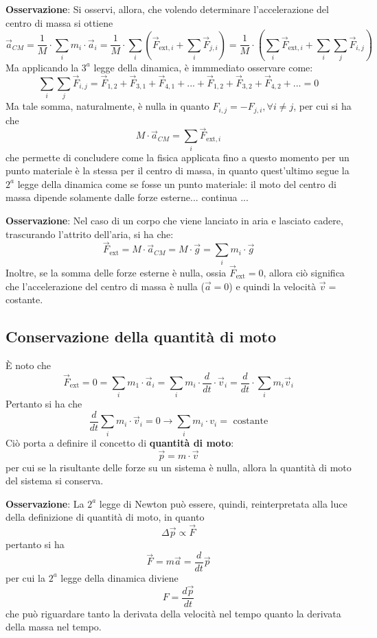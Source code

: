 \documentclass[a4paper]{extarticle}
\begin{document}
\vspace{1em}
\noindent
\textbf{Osservazione}: Si osservi, allora, che volendo determinare l'accelerazione del centro di massa si ottiene
\[\vec a_{CM} = \frac{1}{M} \cdot \sum_i m_i \cdot \vec a_i = \frac{1}{M} \cdot \sum_i \left( \vec F_{\text{ext},i} + \sum_i \vec F_{j,i} \right) = \frac{1}{M} \cdot \left(\sum_i \vec F_{\text{ext},i} + \sum_i \sum_j \vec F_{i,j}\right)\]
Ma applicando la $3^a$ legge della dinamica, è immmediato osservare come:
\[\sum_i \sum_j \vec F_{i,j} = \vec F_{1,2} + \vec F_{3,1} + \vec F_{4,1} + ... + \vec F_{1,2} + \vec F_{3,2} + \vec F_{4,2} + ... = 0\]
Ma tale somma, naturalmente, è nulla in quanto $F_{i,j}=-F_{j,i}, \forall i \neq j$, per cui si ha che
\[\boxed{M \cdot \vec a_{CM} = \sum_i \vec F_{\text{ext},i}}\]
che permette di concludere come la fisica applicata fino a questo momento per un punto materiale è la stessa per il centro di massa, in quanto quest'ultimo segue la $2^a$ legge della dinamica come se fosse un punto materiale: il moto del centro di massa dipende solamente dalle forze esterne... continua ...

\vspace{1em}
\noindent
\textbf{Osservazione}: Nel caso di un corpo che viene lanciato in aria e lasciato cadere, trascurando l'attrito dell'aria, si ha che:
\[\vec F_{\text{ext}} = M \cdot \vec a_{CM} = M \cdot \vec g = \sum_{i} m_i \cdot \vec g\]
Inoltre, se la somma delle forze esterne è nulla, ossia $\vec F_{\text{ext}}=0$, allora ciò significa che l'accelerazione del centro di massa è nulla ($\vec a = 0$) e quindi la velocità $\vec v = $ costante.

\vspace{1em}
\subsection{Conservazione della quantità di moto}
È noto che
\[\vec F_{\text{ext}} = 0 = \sum_i m_1 \cdot \vec a_i = \sum_i m_i \cdot \frac{d}{dt} \cdot \vec v_i = \frac{d}{dt} \cdot \sum_i m_i \vec v_i\]
Pertanto si ha che
\[\frac{d}{dt} \sum_i m_i \cdot \vec v_i = 0 \longrightarrow \sum_i m_i \cdot v_i = \text{ costante}\]
Ciò porta a definire il concetto di \textbf{quantità di moto}:
\[\boxed{\vec p = m \cdot \vec v}\]
per cui se la risultante delle forze su un sistema è nulla, allora la quantità di moto del sistema si conserva.

\vspace{1em}
\noindent
\textbf{Osservazione}: La $2^a$ legge di Newton può essere, quindi, reinterpretata alla luce della definizione di quantità di moto, in quanto
\[\boxed{\Delta \vec p \propto \vec F}\]
pertanto si ha
\[\vec F = m \vec a = \frac{d}{dt} \vec p\]
per cui la $2^a$ legge della dinamica diviene
\[\boxed{F=\frac{d\vec p}{dt}}\]
che può riguardare tanto la derivata della velocità nel tempo quanto la derivata della massa nel tempo.
\end{document}
